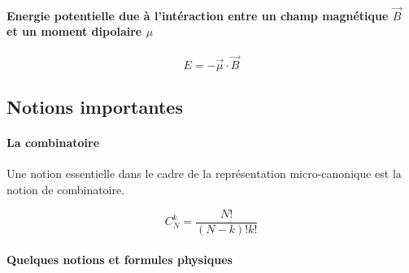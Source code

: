 \paragraph{Energie potentielle due à l'intéraction entre un champ magnétique $\vec{B}$ et un moment dipolaire $\mu$}

\[
	E=- \vec{\mu} \cdot \vec{B}
\]


\subsection{Notions importantes}


\paragraph{La combinatoire}

Une notion essentielle dans le cadre de la représentation micro-canonique est la notion de combinatoire.

\[
	C_N^k=\frac{N!}{(N-k)!k!}
\]


\paragraph{Quelques notions et formules physiques}

